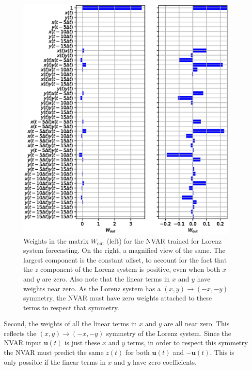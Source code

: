 \begin{figure}
  \includegraphics[width=\textwidth]{figures/nvar-infer-lorenz-wout}
  \caption{Weights in the matrix $W_\text{out}$ (left) for the NVAR
    trained for Lorenz system forecasting. On the right, a magnified
    view of the same. The largest component is the constant offset, to
    account for the fact that the $z$ component of the Lorenz system
    is positive, even when both $x$ and $y$ are zero. Also note that
    the linear terms in $x$ and $y$ have weights near zero. As the
    Lorenz system has a $(x, y) \rightarrow (-x, -y)$ symmetry, the
    NVAR must have zero weights attached to these terms to respect
    that symmetry.}
  \label{fig:nvar-infer-lorenz-wout}
\end{figure}

Second, the weights of all the linear terms in $x$ and $y$ are all
near zero. This reflects the $(x, y) \rightarrow (-x, -y)$ symmetry of
the Lorenz system. Since the NVAR input $\bm{u}(t)$ is just these $x$
and $y$ terms, in order to respect this symmetry the NVAR must predict
the same $z(t)$ for both $\bm{u}(t)$ and $-\bm{u}(t)$. This is only
possible if the linear terms in $x$ and $y$ have zero coefficients.

